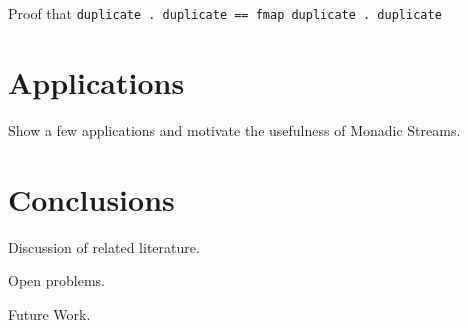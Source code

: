 \documentclass{article}
\begin{document}
Proof that \verb+duplicate . duplicate == fmap duplicate . duplicate+

\section{Applications}

Show a few applications and motivate the usefulness of Monadic Streams.

\section{Conclusions}

Discussion of related literature.

Open problems.

Future Work.


\end{document}
